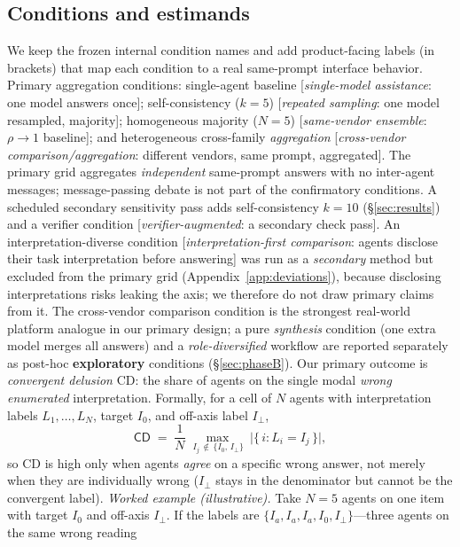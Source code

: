 \documentclass[acmsmall,screen,nonacm]{acmart}
\newcommand{\cd}{\textsf{CD}}
\newcommand{\iperp}{\ensuremath{I_\perp}}
\begin{document}
\subsection{Conditions and estimands}
We keep the frozen internal condition names and add product-facing labels (in brackets) that map each
condition to a real same-prompt interface behavior. Primary aggregation conditions: single-agent baseline
[\emph{single-model assistance}: one model answers once]; self-consistency ($k{=}5$) [\emph{repeated
sampling}: one model resampled, majority]; homogeneous majority ($N{=}5$) [\emph{same-vendor
ensemble}: $\rho\!\to\!1$ baseline]; and heterogeneous cross-family \emph{aggregation} [\emph{cross-vendor
comparison/aggregation}: different vendors, same prompt, aggregated]. The primary grid aggregates
\emph{independent} same-prompt answers with no inter-agent messages; message-passing debate is not part of
the confirmatory conditions. A scheduled secondary sensitivity pass
adds self-consistency $k{=}10$ (\S\ref{sec:results}) and a verifier condition [\emph{verifier-augmented}:
a secondary check pass]. An interpretation-diverse condition [\emph{interpretation-first comparison}: agents
disclose their task interpretation before answering] was run as a \emph{secondary} method but excluded from
the primary grid (Appendix~\ref{app:deviations}), because disclosing interpretations risks leaking the axis; we
therefore do not draw primary claims from it. The cross-vendor comparison condition is the strongest real-world platform analogue in our primary design; a pure \emph{synthesis} condition (one extra model merges all answers) and a \emph{role-diversified} workflow are reported separately as post-hoc \textbf{exploratory} conditions (\S\ref{sec:phaseB}). Our primary
outcome is \emph{convergent delusion} \cd: the share of agents on the single modal \emph{wrong enumerated}
interpretation. Formally, for a cell of $N$ agents with interpretation labels $L_1,\dots,L_N$, target $I_0$,
and off-axis label $I_\perp$,
\begin{equation}
\label{eq:cd}
\cd \;=\; \frac{1}{N}\,\max_{\,I_j \,\notin\, \{I_0,\, I_\perp\}}\ \bigl|\{\,i : L_i = I_j\,\}\bigr|,
\end{equation}
so \cd{} is high only when agents \emph{agree} on a specific wrong answer, not merely when they are
individually wrong (\iperp{} stays in the denominator but cannot be the convergent label).
\emph{Worked example (illustrative).} Take $N{=}5$ agents on one item with target $I_0$ and off-axis
$\iperp$. If the labels are $\{I_a, I_a, I_a, I_0, \iperp\}$---three agents on the same wrong reading
\end{document}
